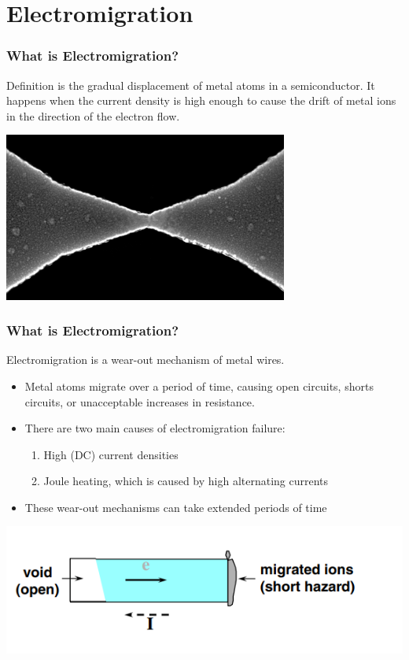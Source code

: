 \documentclass{beamer}
\begin{document}
	\section{Electromigration}
	\begin{frame}
		\frametitle{What is Electromigration?}
		\begin{block}{Definition}
			is the gradual displacement of metal atoms in a semiconductor. It happens when the current density is high enough to cause the drift of metal ions in the direction of the electron flow.
		\end{block}
		\begin{center}
			\includegraphics[width=0.7\textwidth]{EM_1}
		\end{center}
	\end{frame}
	\begin{frame}
		\frametitle{What is Electromigration?}
		Electromigration is a wear-out mechanism of metal wires.
		\newline
		\begin{itemize}
			\item Metal atoms migrate over a period of time, causing open circuits,
			shorts circuits, or unacceptable increases in resistance.
			\item There are two main causes of electromigration failure:
				\begin{enumerate}
					\item High (DC) current densities
					\item Joule heating, which is caused by high alternating currents
				\end{enumerate}
			\item These wear-out mechanisms can take extended periods of time
		\end{itemize}
	\begin{center}
		\includegraphics[width=\textwidth]{EM1}
	\end{center}
	\end{frame}	
	
\end{document}
